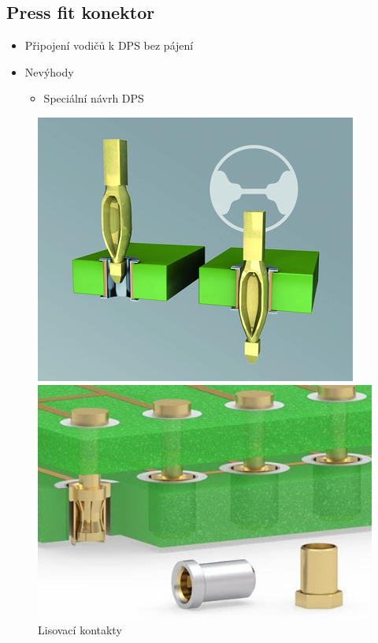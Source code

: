 \documentclass{article}
\begin{document}
\newpage
\subsection{Press fit konektor}
\begin{itemize}
  \item Připojení vodičů k DPS bez pájení
  \item Nevýhody
  \begin{itemize}
    \item Speciální návrh DPS
  \end{itemize}
\end{itemize}

\begin{figure}[H]
  \begin{minipage}[t]{0.456\textwidth}
    \centering
    \includegraphics[width=\textwidth]{pressFit1.jpg}
  \end{minipage}
  \hfil
  \begin{minipage}[t]{0.5439\textwidth}
    \includegraphics[width=\textwidth]{pressFit2.jpg}
    \centering
  \end{minipage}
  \caption{Lisovací kontakty}
\end{figure}
\end{document}
